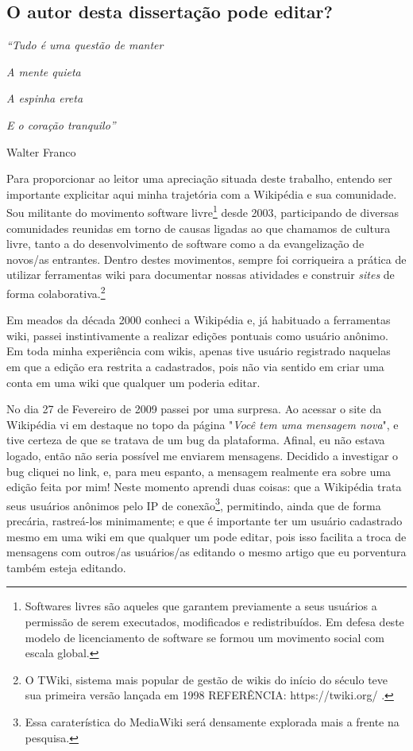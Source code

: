 \subsection{O autor desta dissertação pode editar?}

\singlespacing
\begin{flushright}

\textit{``Tudo é uma questão de manter}

\textit{A mente quieta}

\textit{A espinha ereta}

\textit{E o coração tranquilo''}

Walter Franco

\end{flushright}
\doublespacing

Para proporcionar ao leitor uma apreciação situada deste trabalho, entendo ser importante explicitar aqui minha trajetória com a Wikipédia e sua comunidade. Sou militante do movimento software livre\footnote{Softwares livres são aqueles que garantem previamente a seus usuários a permissão de serem executados, modificados e redistribuídos. Em defesa deste modelo de licenciamento de software se formou um movimento social com escala global.} desde 2003, participando de diversas comunidades reunidas em torno de causas ligadas ao que chamamos de cultura livre, tanto a do desenvolvimento de software como a da evangelização de novos/as entrantes. Dentro destes movimentos, sempre foi corriqueira a prática de utilizar ferramentas wiki para documentar nossas atividades e construir \textit{sites} de forma colaborativa.\footnote{O TWiki, sistema mais popular de gestão de wikis do início do século teve sua primeira versão lançada em 1998 REFERÊNCIA: https://twiki.org/ .}

Em meados da década 2000 conheci a Wikipédia e, já habituado a ferramentas wiki, passei instintivamente a realizar edições pontuais como usuário anônimo. Em toda minha experiência com wikis, apenas tive usuário registrado naquelas em que a edição era restrita a cadastrados, pois não via sentido em criar uma conta em uma wiki que qualquer um poderia editar.

No dia 27 de Fevereiro de 2009 passei por uma surpresa. Ao acessar o site da Wikipédia vi em destaque no topo da página "\textit{Você tem uma mensagem nova}", e tive certeza de que se tratava de um bug da plataforma. Afinal, eu não estava logado, então não seria possível me enviarem mensagens. Decidido a investigar o bug cliquei no link, e, para meu espanto, a mensagem realmente era sobre uma edição feita por mim! Neste momento aprendi duas coisas: que a Wikipédia trata seus usuários anônimos pelo IP de conexão\footnote{Essa caraterística do MediaWiki será densamente explorada mais a frente na pesquisa.}, permitindo, ainda que de forma precária, rastreá-los minimamente; e que é importante ter um usuário cadastrado mesmo em uma wiki em que qualquer um pode editar, pois isso facilita a troca de mensagens com outros/as usuários/as editando o mesmo artigo que eu porventura também esteja editando.

